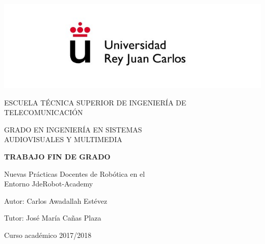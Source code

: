 \begin{titlepage}
	\begin{center}
		\vspace*{3mm}
		\begin{center}
			\includegraphics[width=0.8\linewidth]{figures/logo.jpg}
		\end{center}
		\vspace{6.5mm}
		
		\fontsize{15.5}{14}\selectfont ESCUELA TÉCNICA SUPERIOR DE INGENIERÍA DE TELECOMUNICACIÓN
		\vspace{13mm}
		
		\fontsize{14}{14}\selectfont GRADO EN INGENIERÍA EN SISTEMAS \\ AUDIOVISUALES Y MULTIMEDIA
		
		\vspace{55pt}
		
		\fontsize{15.7}{14}\selectfont \textbf{TRABAJO FIN DE GRADO} 
		
		\vspace{25mm}
		\begin{huge}
			Nuevas Prácticas Docentes de Robótica en el \\ \vspace{0.4cm} Entorno JdeRobot-Academy
		\end{huge}
		
		\vspace{25mm}
		
		\begin{large}
			Autor: Carlos Awadallah Estévez
			
			Tutor: José María Cañas Plaza
			
			\vspace{10mm}
		\end{large}
		\begin{normalsize}
			Curso académico 2017/2018		
		\end{normalsize}
		\vspace{10mm}
		
	\end{center}
	
\end{titlepage}


